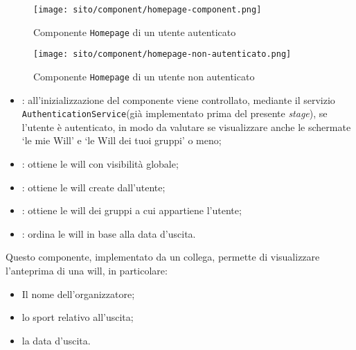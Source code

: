 \begin{figure}[H]

    \centerline{\texttt{[image: sito/component/homepage-component.png]}}
    \caption{Componente \texttt{Homepage} di un utente autenticato}
\end{figure}

\begin{figure}[H]

    \centerline{\texttt{[image: sito/component/homepage-non-autenticato.png]}}
    \caption{Componente \texttt{Homepage} di un utente non autenticato}
\end{figure}


\begin{itemize}
    \item {}: all'inizializzazione del componente viene
          controllato, mediante il servizio \texttt{AuthenticationService}(già
          implementato prima del presente \textit{stage}), se l'utente è
          autenticato, in modo da valutare se visualizzare anche le schermate
          \enquote*{le mie Will} e \enquote*{le Will dei tuoi gruppi} o meno;
    \item {}: ottiene le \gls{will} con
          visibilità globale;
    \item {}: ottiene le \gls{will} create dall'utente;
    \item {}: ottiene le \gls{will} dei gruppi a cui
          appartiene l'utente;
    \item {}: ordina le \gls{will} in base alla data d'uscita.
\end{itemize}

\label{par:WillCard}
Questo componente, implementato da un collega, permette di visualizzare
l'anteprima di una \gls{will}, in particolare:
\begin{itemize}
    \item Il nome dell'organizzatore;
    \item lo sport relativo all'uscita;
    \item la data d'uscita.
\end{itemize}

